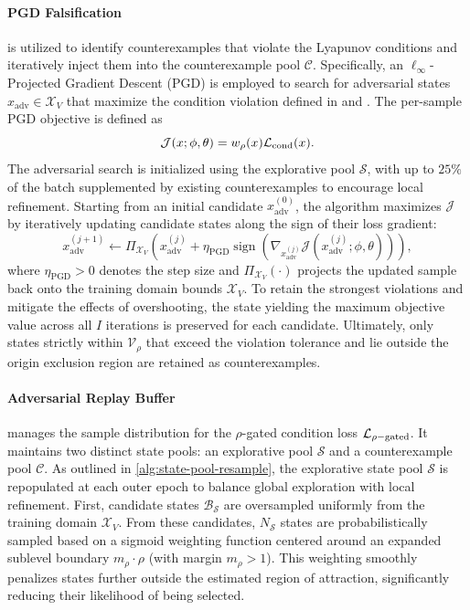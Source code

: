 \paragraph{PGD Falsification} is utilized to identify counterexamples that violate the Lyapunov 
conditions and iteratively inject them into the counterexample pool $\mathcal{C}$. 
Specifically, an $\ell_\infty$-Projected Gradient Descent (PGD) is employed 
to search for adversarial states $x_{\mathrm{adv}} \in \mathcal{X}_V$ 
that maximize the condition violation defined in  
and . The per-sample PGD objective is defined as
\begin{equation}
    \label{eq:pgd-objective}
    \mathcal{J}(x; \phi, \theta) = w_{\rho}(x) \mathcal{L}_{\mathrm{cond}}(x).
\end{equation}
The adversarial search is initialized using the explorative pool $\mathcal{S}$, 
with up to $25\%$ of the batch supplemented by existing counterexamples to encourage local refinement.
Starting from an initial candidate $x_{\mathrm{adv}}^{(0)}$, the algorithm maximizes $\mathcal{J}$ 
by iteratively updating candidate states along the sign of their loss gradient:
\begin{equation}
    \label{eq:pgd-update-lyapunov}
    x_{\mathrm{adv}}^{(j+1)} \leftarrow \Pi_{\mathcal{X}_V} \left(
        x_{\mathrm{adv}}^{(j)} + \eta_{\mathrm{PGD}} \operatorname{sign} \left(
            \nabla_{x_{\mathrm{adv}}^{(j)}} \mathcal{J}\left(x_{\mathrm{adv}}^{(j)}; \phi, \theta\right)
        \right)
    \right),
\end{equation}
where $\eta_{\mathrm{PGD}} > 0$ denotes the step size and $\Pi_{\mathcal{X}_V}(\cdot)$ projects the updated 
sample back onto the training domain bounds $\mathcal{X}_V$. 
To retain the strongest violations and mitigate the effects of overshooting, the state yielding the 
maximum objective value across all $I$ iterations is preserved for each candidate. 
Ultimately, only states strictly within $\mathcal{V}_\rho$ that exceed the violation tolerance 
and lie outside the origin exclusion region are retained as counterexamples.


\paragraph{Adversarial Replay Buffer} manages the sample distribution for the $\rho$-gated condition loss $\mathcal{L}_{\rho\mathrm{-gated}}$. 
It maintains two distinct state pools: an explorative pool $\mathcal{S}$ and a counterexample pool $\mathcal{C}$. \newline
As outlined in \cref{alg:state-pool-resample}, the explorative state pool $\mathcal{S}$ is repopulated 
at each outer epoch to balance global exploration with local refinement. 
First, candidate states $\mathcal{B}_{\mathcal{S}}$ are oversampled uniformly from the training domain $\mathcal{X}_V$. 
From these candidates, $N_{\mathcal{S}}$ states are probabilistically sampled based on a sigmoid weighting function 
centered around an expanded sublevel boundary $m_\rho \cdot \rho$ (with margin $m_\rho > 1$). 
This weighting smoothly penalizes states further outside the estimated region of attraction, 
significantly reducing their likelihood of being selected.

